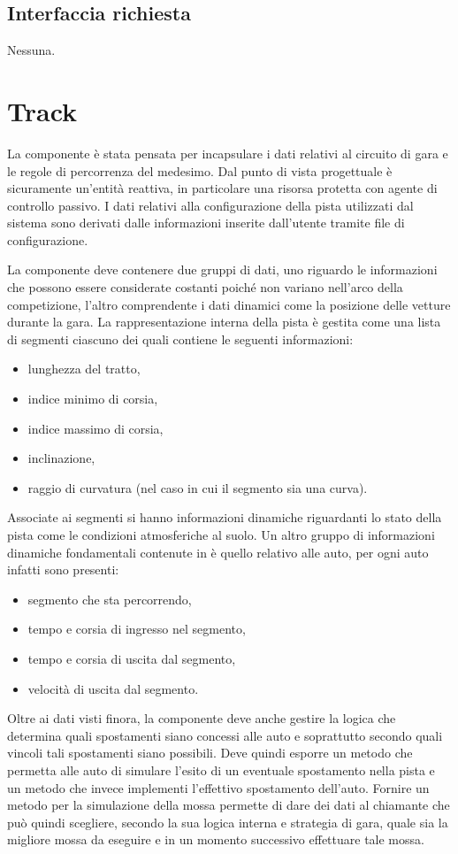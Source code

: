 \subsection*{Interfaccia richiesta}
Nessuna.

\section{Track}
La componente \track{} è stata pensata per incapsulare i dati relativi al circuito di gara e le regole di percorrenza del medesimo. Dal punto di vista progettuale \track{} è sicuramente un'entità reattiva, in particolare una risorsa protetta con agente di controllo passivo.
I dati relativi alla configurazione della pista utilizzati dal sistema sono derivati dalle informazioni inserite dall'utente tramite file di configurazione.

La componente \track{} deve contenere due gruppi di dati, uno riguardo le informazioni che possono essere considerate costanti poiché non variano nell'arco della competizione, l'altro comprendente i dati dinamici come la posizione delle vetture durante la gara.
La rappresentazione interna della pista è gestita come una lista di segmenti ciascuno dei quali contiene le seguenti informazioni:
\begin{itemize}
\item lunghezza del tratto,
\item indice minimo di corsia,
\item indice massimo di corsia,
\item inclinazione,
\item raggio di curvatura (nel caso in cui il segmento sia una curva).
\end{itemize}
Associate ai segmenti si hanno informazioni dinamiche riguardanti lo stato della pista come le condizioni atmosferiche al suolo.
Un altro gruppo di informazioni dinamiche fondamentali contenute in \track{} è quello relativo alle auto, per ogni auto infatti sono presenti:
\begin{itemize}
\item segmento che sta percorrendo,
\item tempo e corsia di ingresso nel segmento,
\item tempo e corsia di uscita dal segmento,
\item velocità di uscita dal segmento.
\end{itemize}

Oltre ai dati visti finora, la componente \track{} deve anche gestire la logica che determina quali spostamenti siano concessi alle auto e soprattutto secondo quali vincoli tali spostamenti siano possibili. Deve quindi esporre un metodo che permetta alle auto di simulare l'esito di un eventuale spostamento nella pista e un metodo che invece implementi l'effettivo spostamento dell'auto. Fornire un metodo per la simulazione della mossa permette di dare dei dati al chiamante che può quindi scegliere, secondo la sua logica interna e strategia di gara, quale sia la migliore mossa da eseguire e in un momento successivo effettuare tale mossa.

